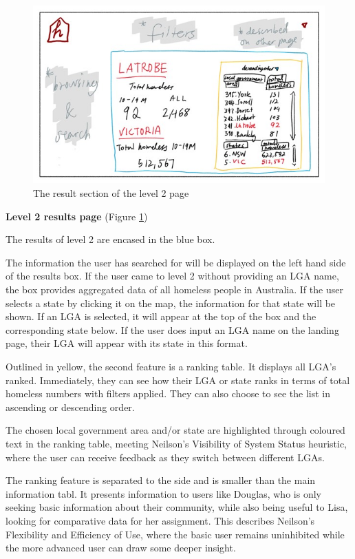 \documentclass[12pt, a4paper]{article}
\begin{document}
\begin{figure}[h]
\centering
\includegraphics[scale=.9]{level2inner.jpg} 
\caption{The result section of the level 2 page}
\label{fig:2inner}
\end{figure}
\textbf{Level 2 results page} (Figure \ref{fig:2inner}) 

The results of level 2 are encased in the blue box.

The information the user has searched for will be displayed on the left hand side of the results box. If the user came to level 2 without providing an LGA name, the box provides aggregated data of all homeless people in Australia. If the user selects a state by clicking it on the map, the information for that state will be shown. If an LGA is selected, it will appear at the top of the box and the corresponding state below. If the user does input an LGA name on the landing page, their LGA will appear with its state in this format.

Outlined in yellow, the second feature is a ranking table. It displays all LGA's ranked. Immediately, they can see how their LGA or state ranks in terms of total homeless numbers with filters applied. They can also choose to see the list in ascending or descending order.

The chosen local government area and/or state are highlighted through coloured text in the ranking table, meeting Neilson’s Visibility of System Status heuristic, where the user can receive feedback as they switch between different LGAs. 

The ranking feature is separated to the side and is smaller than the main information tabl. It presents information to users like Douglas, who is only seeking basic information about their community, while also being useful to Lisa, looking for comparative data for her assignment. This describes Neilson’s Flexibility and Efficiency of Use, where the basic user remains uninhibited while the more advanced user can draw some deeper insight.
\end{document}
